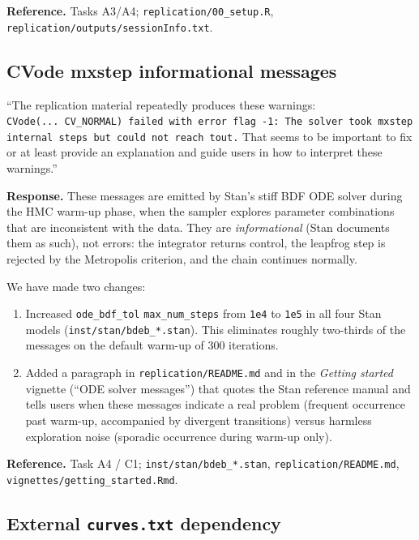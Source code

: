 \documentclass[11pt,a4paper]{article}
\newcommand{\code}[1]{\texttt{#1}}
\begin{document}
\textbf{Reference.} Tasks A3/A4; \code{replication/00\_setup.R},
\code{replication/outputs/sessionInfo.txt}.

\subsection{CVode mxstep informational messages}

\begin{displayquote}
``The replication material repeatedly produces these warnings:
\code{CVode(...\ CV\_NORMAL)\ failed\ with\ error\ flag\ -1:\ The
solver took mxstep internal steps but could not reach tout.} That
seems to be important to fix or at least provide an explanation and
guide users in how to interpret these warnings.''
\end{displayquote}

\textbf{Response.} These messages are emitted by Stan's stiff BDF ODE
solver during the HMC warm-up phase, when the sampler explores
parameter combinations that are inconsistent with the data. They are
\emph{informational} (Stan documents them as such), not errors: the
integrator returns control, the leapfrog step is rejected by the
Metropolis criterion, and the chain continues normally.

We have made two changes:

\begin{enumerate}[nosep]
\item Increased \code{ode\_bdf\_tol} \code{max\_num\_steps} from
  \code{1e4} to \code{1e5} in all four Stan models
  (\code{inst/stan/bdeb\_*.stan}). This eliminates roughly two-thirds
  of the messages on the default warm-up of 300 iterations.
\item Added a paragraph in \code{replication/README.md} and in the
  \emph{Getting started} vignette (``ODE solver messages'') that
  quotes the Stan reference manual and tells users when these
  messages indicate a real problem (frequent occurrence past warm-up,
  accompanied by divergent transitions) versus harmless exploration
  noise (sporadic occurrence during warm-up only).
\end{enumerate}

\textbf{Reference.} Task A4 / C1; \code{inst/stan/bdeb\_*.stan},
\code{replication/README.md}, \code{vignettes/getting\_started.Rmd}.

\subsection{External \code{curves.txt} dependency}
\end{document}
